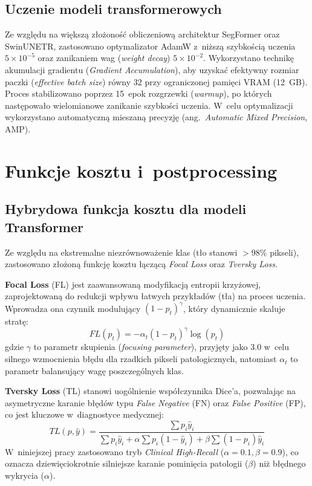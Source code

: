\documentclass[12pt,a4paper,oneside]{report}
\begin{document}
\subsection{Uczenie modeli transformerowych} 
Ze względu na większą złożoność obliczeniową architektur SegFormer oraz SwinUNETR, zastosowano optymalizator AdamW z~niższą szybkością uczenia $5 \times 10^{-5}$ oraz zanikaniem wag (\textit{weight decay}) $5 \times 10^{-2}$. Wykorzystano technikę akumulacji gradientu (\textit{Gradient Accumulation}), aby uzyskać efektywny rozmiar paczki (\textit{effective batch size}) równy 32 przy ograniczonej pamięci VRAM (12~GB). Proces stabilizowano poprzez 15~epok rozgrzewki (\textit{warmup}), po których następowało wielomianowe zanikanie szybkości uczenia. W~celu optymalizacji wykorzystano automatyczną mieszaną precyzję (ang.~\textit{Automatic Mixed Precision}, AMP).

\section{Funkcje kosztu i~postprocessing}

\subsection{Hybrydowa funkcja kosztu dla modeli Transformer}
Ze względu na ekstremalne niezrównoważenie klas (tło stanowi $>98\%$ pikseli), zastosowano złożoną funkcję kosztu łączącą \textit{Focal Loss} oraz \textit{Tversky Loss}. 

\textbf{Focal Loss} (FL) jest zaawansowaną modyfikacją entropii krzyżowej, zaprojektowaną do redukcji wpływu łatwych przykładów (tła) na proces uczenia. Wprowadza ona czynnik modulujący $(1 - p_t)^\gamma$, który dynamicznie skaluje stratę:
\begin{equation}
    FL(p_t) = -\alpha_t (1 - p_t)^\gamma \log(p_t)
\end{equation}
gdzie $\gamma$ to parametr skupienia (\textit{focusing parameter}), przyjęty jako $3.0$ w~celu silnego wzmocnienia błędu dla rzadkich pikseli patologicznych, natomiast $\alpha_t$ to parametr balansujący wagę poszczególnych klas.

\textbf{Tversky Loss} (TL) stanowi uogólnienie współczynnika Dice'a, pozwalając na asymetryczne karanie błędów typu \textit{False Negative} (FN) oraz \textit{False Positive} (FP), co jest kluczowe w~diagnostyce medycznej:
\begin{equation}
    TL(p, \hat{y}) = \frac{\sum p_i \hat{y}_i}{\sum p_i \hat{y}_i + \alpha \sum p_i (1-\hat{y}_i) + \beta \sum (1-p_i) \hat{y}_i}
\end{equation}
W~niniejszej pracy zastosowano tryb \textit{Clinical High-Recall} ($\alpha=0.1, \beta=0.9$), co oznacza dziewięciokrotnie silniejsze karanie pominięcia patologii ($\beta$) niż błędnego wykrycia ($\alpha$).
\end{document}
